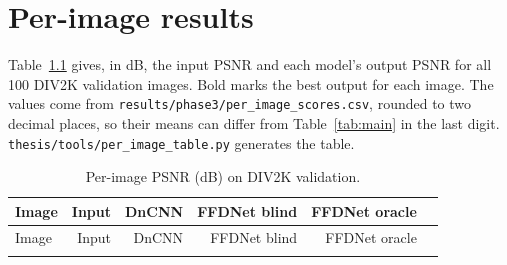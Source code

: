 \chapter{Per-image results}\label{app:per-image}

Table~\ref{tab:per-image} gives, in dB, the input PSNR and each model's
output PSNR for all 100 DIV2K validation images. Bold marks the best output
for each image. The values come from
\texttt{results/phase3/per\_image\_scores.csv}, rounded to two decimal
places, so their means can differ from Table~\ref{tab:main} in the last
digit. \texttt{thesis/tools/per\_image\_table.py} generates the table.

{\small
\begin{longtable}{@{}lrrrrr@{}}
	\caption{Per-image PSNR (dB) on DIV2K validation.}\label{tab:per-image}\\
	\toprule
	Image & Input & DnCNN & FFDNet blind & FFDNet oracle & \fcsg{} \\
	\midrule
	\endfirsthead
	\toprule
	Image & Input & DnCNN & FFDNet blind & FFDNet oracle & \fcsg{} \\
	\midrule
	\endhead
	\bottomrule
	\endfoot
	
\end{longtable}
}
